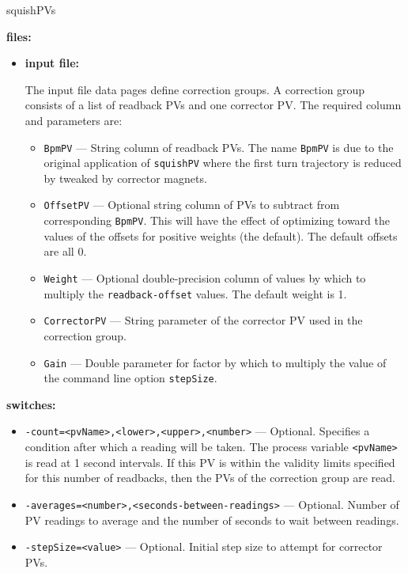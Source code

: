 \begin{sddsprog}{squishPVs}
\item \textbf{files:}
\begin{itemize}
\item \textbf{input file:}\par
The input file data pages define correction groups. A correction group
consists of a list of readback PVs and one corrector PV. The required column and parameters are:
\begin{itemize}
        \item {\tt BpmPV} --- String column of readback PVs. The name \verb+BpmPV+ is due
                to the original application of \verb+squishPV+ where the first turn
                trajectory is reduced by tweaked by corrector magnets.
        \item {\tt OffsetPV} --- Optional string column of PVs to subtract from corresponding \verb+BpmPV+.
                This will have the effect of optimizing toward the values of the offsets for
                positive weights (the default).  The default offsets are all 0.
        \item {\tt Weight} --- Optional double-precision column of values by which to multiply the
                \verb+readback-offset+ values.  The default weight is 1.
        \item {\tt CorrectorPV} --- String parameter of the corrector PV used in the correction group.
        \item {\tt Gain} --- Double parameter for factor by which to multiply the
                value of the command line option \verb+stepSize+.
\end{itemize}
\end{itemize}
\item \textbf{switches:}
    \begin{itemize}
      \item {\tt -count=<pvName>,<lower>,<upper>,<number>} --- Optional. Specifies
                a condition after which a reading will be taken. The process variable
                \verb+<pvName>+ is read at 1 second intervals. If this
                PV is within the validity limits specified for this number of readbacks, then
                the PVs of the correction group are read.                
        \item {\tt -averages=<number>,<seconds-between-readings>} --- Optional. Number of PV readings to average
                and the number of seconds to wait between readings.
        \item {\tt -stepSize=<value>} --- Optional. Initial step size to attempt for corrector PVs.

\end{itemize}
\end{sddsprog}
